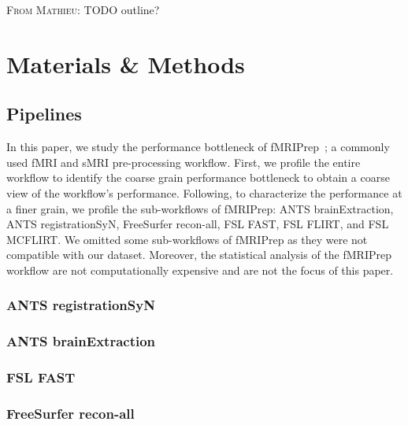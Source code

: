 \documentclass[conference]{IEEEtran}
\newcommand{\MD}[1]{\color{magenta}\textsc{From Mathieu: }#1\color{black}}
\begin{document}
\MD{TODO outline?}


\section{Materials \& Methods}
\subsection{Pipelines}
In this paper, we study the performance bottleneck of fMRIPrep~\cite{Esteban2019-og}; a commonly used fMRI and sMRI pre-processing workflow. First, we profile the entire workflow to identify the coarse grain performance bottleneck to obtain a coarse view of the workflow's performance. Following, to characterize the performance at a finer grain, we profile the sub-workflows of fMRIPrep: ANTS brainExtraction, ANTS registrationSyN, FreeSurfer recon-all, FSL FAST, FSL FLIRT, and FSL MCFLIRT. We omitted some sub-workflows of fMRIPrep as they were not compatible with our dataset. Moreover, the statistical analysis of the fMRIPrep workflow are not computationally expensive and are not the focus of this paper.

\subsubsection{ANTS registrationSyN}


\subsubsection{ANTS brainExtraction}


\subsubsection{FSL FAST}


\subsubsection{FreeSurfer recon-all}
\end{document}
